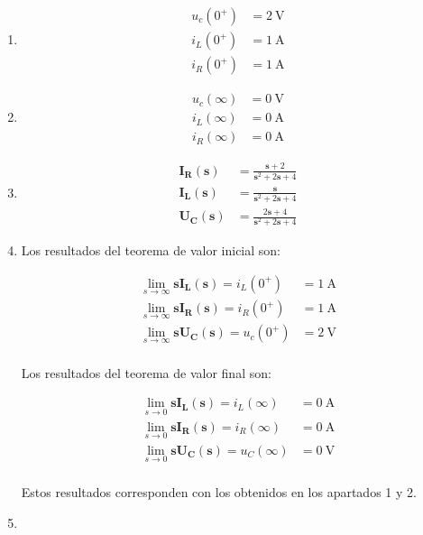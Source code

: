 \documentclass[12pt]{article}
\newcommand{\laplace}[1]{\mathbf{#1}(\mathbf{s})}
\newcommand{\slp}{\mathbf{s}}
\begin{document}
\begin{enumerate}
\item

  \begin{align*}
    u_c(0^+) &= \SI{2}{\volt}\\
    i_L(0^+) &= \SI{1}{\ampere}\\
    i_R(0^+) &= \SI{1}{\ampere}
  \end{align*}
  
\item
  \begin{align*}
    u_c(\infty) &= \SI{0}{\volt}\\
    i_L(\infty) &= \SI{0}{\ampere}\\
    i_R(\infty) &= \SI{0}{\ampere}
  \end{align*}
  
\item
  \begin{align*}
    \laplace{I_R} &= \frac{\slp + 2}{\slp^2 + 2\slp + 4}\\
    \laplace{I_L} &= \frac{\slp}{\slp^2 + 2\slp + 4}\\
    \laplace{U_C} &= \frac{2\slp + 4}{\slp^2 + 2\slp + 4}
  \end{align*}
\item
  
  Los resultados del teorema de valor inicial son:

  \begin{align*}
    \lim_{s \to \infty} \slp \laplace{I_L} = i_L(0^+) &= \SI{1}{\ampere}\\
    \lim_{s \to \infty} \slp \laplace{I_R} = i_R(0^+) &= \SI{1}{\ampere}\\
    \lim_{s \to \infty} \slp \laplace{U_C} = u_c(0^+) &= \SI{2}{\volt}\\
  \end{align*}

  Los resultados del teorema de valor final son:

  \begin{align*}
    \lim_{s \to 0} \slp \laplace{I_L} = i_L(\infty) &= \SI{0}{\ampere}\\
    \lim_{s \to 0} \slp \laplace{I_R} = i_R(\infty) &= \SI{0}{\ampere}\\
    \lim_{s \to 0} \slp \laplace{U_C} = u_C(\infty) &= \SI{0}{\volt}\\
  \end{align*}

  Estos resultados corresponden con los obtenidos en los apartados 1 y 2.
\item


\end{enumerate}
\end{document}
